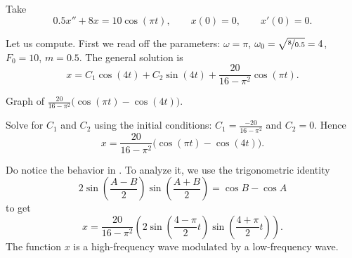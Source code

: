 \begin{example}
Take
\begin{equation*}
0.5 x'' + 8 x = 10 \cos (\pi t), \qquad x(0)=0, \qquad x'(0)=0 .
\end{equation*}

Let us compute.  First we read off the parameters:
$\omega = \pi$, $\omega_0 = \sqrt{\nicefrac{8}{0.5}} = 4$, $F_0 = 10$,
$m=0.5$.  The general solution is
\begin{equation*}
x = C_1 \cos (4 t) + C_2 \sin (4 t) +
\frac{20}{16 - \pi^2} \cos (\pi t) .
\end{equation*}

\begin{mywrapfig}[15]{3.25in}
\capstart
{}
\caption{Graph of
$\frac{20}{16 - \pi^2} \bigl( \cos (\pi t)- \cos (4 t) \bigr)$.\label{3.6:beatingfig}}
\end{mywrapfig}
%
%


Solve for $C_1$ and $C_2$ using the initial conditions:
$C_1 = \frac{-20}{16 - \pi^2}$ and $C_2 = 0$.  Hence
\begin{equation*}
x = 
\frac{20}{16 - \pi^2} \bigl( \cos (\pi t)- \cos (4 t) \bigr) .
\end{equation*}


Do notice the  behavior
in .  To analyze it, we
use the 
trigonometric identity
\begin{equation*}
2\sin \left( \frac{A-B}{2} \right) \sin \left( \frac{A+B}{2} \right) =
\cos B -\cos A 
\end{equation*}
to get 
\begin{equation*}
x = 
\frac{20}{16 - \pi^2} \left( 2 \sin \left(\frac{4-\pi}{2} t \right)
\sin \left( \frac{4+\pi}{2} t \right) \right) .
\end{equation*}
The function $x$ is a high-frequency wave modulated by a low-frequency
wave.
\end{example}

